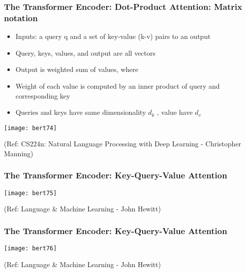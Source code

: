 \begin{frame}[fragile]\frametitle{The Transformer Encoder: Dot-Product Attention: Matrix notation}


      \begin{itemize}
			\item Inputs: a query q and a set of key-value (k-v) pairs to an output
			\item Query, keys, values, and output are all vectors
			\item Output is weighted sum of values, where
			\item Weight of each value is computed by an inner product of query and corresponding key
			\item Queries and keys have same dimensionality $d_k$ , value have $d_v$
			\end{itemize}
			
			\begin{center}
			\texttt{[image: bert74]}
			\end{center}		
			
			{\tiny (Ref: CS224n: Natural Language Processing with Deep Learning - Christopher Manning)}

\end{frame}

\begin{frame}[fragile]\frametitle{The Transformer Encoder: Key-Query-Value Attention}

			
			\begin{center}
			\texttt{[image: bert75]}
			\end{center}		
			
{\tiny (Ref: Language \& Machine Learning - John Hewitt)}

\end{frame}

\begin{frame}[fragile]\frametitle{The Transformer Encoder: Key-Query-Value Attention}

			
			\begin{center}
			\texttt{[image: bert76]}
			\end{center}		
			
{\tiny (Ref: Language \& Machine Learning - John Hewitt)}

\end{frame}

